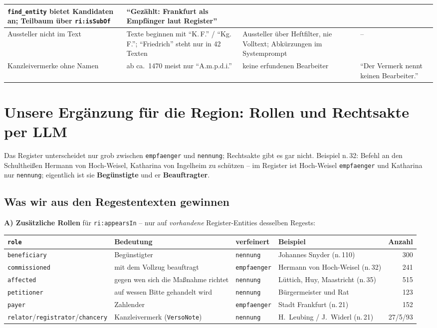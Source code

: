 \documentclass[10pt,a4paper]{article}
\newcommand{\code}[1]{\texttt{\small #1}}
\begin{document}
\begin{small}
\begin{longtable}{@{}p{2.3cm}p{5.7cm}p{4.3cm}p{3.3cm}@{}}
\code{find\_entity} bietet Kandidaten an; Teilbaum über \code{ri:isSubOf} &
\enquote{Gezählt: Frankfurt als Empfänger laut Register}\\\midrule
Aussteller nicht im Text &
Texte beginnen mit \enquote{K.\,F.} / \enquote{Kg.\,F.}; \enquote{Friedrich} steht nur in 42 Texten &
Aussteller über Heftfilter, nie Volltext; Abkürzungen im Systemprompt & --\\\midrule
Kanzleivermerke ohne Namen &
ab ca.\ 1470 meist nur \enquote{A.m.p.d.i.} &
keine erfundenen Bearbeiter &
\enquote{Der Vermerk nennt keinen Bearbeiter.}\\
\bottomrule
\end{longtable}
\end{small}

\section{Unsere Ergänzung für die Region: Rollen und Rechtsakte per LLM}

Das Register unterscheidet nur grob zwischen \code{empfaenger} und \code{nennung}; Rechtsakte gibt es gar nicht. Beispiel n.\,32: Befehl an den Schultheißen Hermann von Hoch-Weisel, Katharina von Ingelheim zu schützen -- im Register ist Hoch-Weisel \code{empfaenger} und Katharina nur \code{nennung}; eigentlich ist sie \textbf{Begünstigte} und er \textbf{Beauftragter}.

\subsection{Was wir aus den Regestentexten gewinnen}

\textbf{A) Zusätzliche Rollen} für \code{ri:appearsIn} -- nur auf \emph{vorhandene} Register-Entities desselben Regests:

\begin{small}
\begin{tabularx}{\textwidth}{@{}p{3.6cm}Lp{1.8cm}p{4.2cm}r@{}}
\toprule
\code{role} & Bedeutung & verfeinert & Beispiel & Anzahl\\\midrule
\code{beneficiary} & Begünstigter & \code{nennung} & Johannes Snyder (n.\,110) & 300\\
\code{commissioned} & mit dem Vollzug beauftragt & \code{empfaenger} & Hermann von Hoch-Weisel (n.\,32) & 241\\
\code{affected} & gegen wen sich die Maßnahme richtet & \code{nennung} & Lüttich, Huy, Maastricht (n.\,35) & 515\\
\code{petitioner} & auf wessen Bitte gehandelt wird & \code{nennung} & Bürgermeister und Rat & 123\\
\code{payer} & Zahlender & \code{empfaenger} & Stadt Frankfurt (n.\,21) & 152\\
\code{relator}/\allowbreak\code{registrator}/\allowbreak\code{chancery} & Kanzleivermerk (\code{VersoNote}) & \code{nennung} & H.\ Leubing / J.\ Widerl (n.\,21) & 27/5/93\\
\bottomrule
\end{tabularx}
\end{small}
\end{document}
